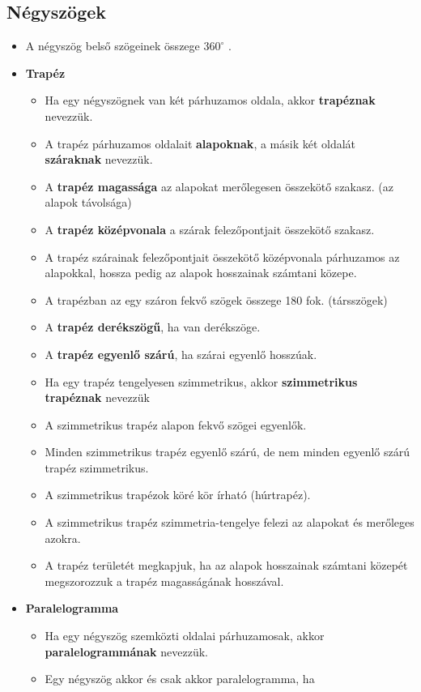 \documentclass[a4paper,11pt]{article}
\begin{document}
\subsection*{Négyszögek}
\begin{itemize}
\item A négyszög belső szögeinek összege $360^\circ$ .
\item \textbf{Trapéz} 
\begin{itemize}[label=$\circ$]
\item Ha egy négyszögnek van két párhuzamos oldala, akkor \textbf{trapéznak} nevezzük.
\item A trapéz párhuzamos oldalait \textbf{alapoknak}, a másik két oldalát \textbf{száraknak} nevezzük.
\item A \textbf{trapéz magassága} az alapokat merőlegesen összekötő szakasz. (az alapok távolsága)
\item A \textbf{trapéz középvonala} a szárak felezőpontjait összekötő szakasz.
\item A trapéz szárainak felezőpontjait összekötő középvonala párhuzamos az alapokkal, hossza pedig az alapok hosszainak számtani közepe.
\item A trapézban az egy száron fekvő szögek összege 180 fok. (társszögek)
\item A \textbf{trapéz derékszögű}, ha van derékszöge.
\item A \textbf{trapéz egyenlő szárú}, ha szárai egyenlő hosszúak.
\item Ha egy trapéz tengelyesen szimmetrikus, akkor \textbf{szimmetrikus trapéznak} nevezzük
\item A szimmetrikus trapéz alapon fekvő szögei egyenlők.
\item Minden szimmetrikus trapéz egyenlő szárú, de nem minden egyenlő szárú trapéz szimmetrikus.
\item A szimmetrikus trapézok köré kör írható (húrtrapéz).
\item A szimmetrikus trapéz szimmetria-tengelye felezi az alapokat és merőleges azokra.
\item A trapéz területét megkapjuk, ha az alapok hosszainak számtani közepét megszorozzuk a trapéz magasságának hosszával.
\end{itemize}
\item \textbf{Paralelogramma}
\begin{itemize}[label=$\circ$]
\item Ha egy négyszög szemközti oldalai párhuzamosak, akkor \textbf{paralelogrammának} nevezzük.
\item Egy négyszög akkor és csak akkor paralelogramma, ha

\end{itemize}
\end{itemize}
\end{document}
